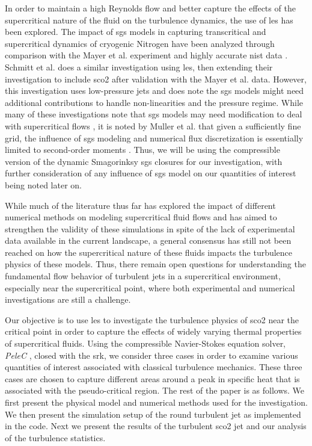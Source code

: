 In order to maintain a high Reynolds flow and better capture the effects of the supercritical nature of the fluid on the turbulence dynamics, the use of \gls{les} has been explored. The impact of \gls{sgs} models in capturing transcritical and supercritical dynamics of cryogenic Nitrogen have been analyzed through comparison with the Mayer et al. experiment and highly accurate \gls{nist} data \cite{PETIT201361, doi:10.1080/00102200500287613, doi:10.1063/1.1795011, doi:10.1063/1.4937948, Same_LES}. Schmitt et al. does a similar investigation using \gls{les}, then extending their investigation to include \gls{sco2} after validation with the Mayer et al. data. \cite{LES_N} However, this investigation uses low-pressure jets and does note the \gls{sgs} models might need additional contributions to handle non-linearities and the pressure regime. While many of these investigations note that \gls{sgs} models may need modification to deal with supercritical flows \cite{LES_N, PETIT201361, doi:10.1063/1.4937948, doi:10.1080/00102200500287613}, it is noted by Muller et al. that given a sufficiently fine grid, the influence of \gls{sgs} modeling and numerical flux discretization is essentially limited to second-order moments \cite{doi:10.1063/1.4937948}. Thus, we will be using the compressible version of the dynamic Smagorinksy \gls{sgs} closures for our investigation, with further consideration of any influence of \gls{sgs} model on our quantities of interest being noted later on. 

While much of the literature thus far has explored the impact of different numerical methods on modeling supercritical fluid flows and has aimed to strengthen the validity of these simulations in spite of the lack of experimental data available in the current landscape, a general consensus has still not been reached on how the supercritical nature of these fluids impacts the turbulence physics of these models. Thus, there remain open questions for understanding the fundamental flow behavior of turbulent jets in a supercritical environment, especially near the supercritical point, where both experimental and numerical investigations are still a challenge.

Our objective is to use \gls{les} to investigate the turbulence physics of \gls{sco2} near the critical point in order to capture the effects of widely varying thermal properties of supercritical fluids. Using the compressible Navier-Stokes equation solver, \textit{PeleC} \cite{osti_1374142}, closed with the \gls{srk}, we consider three cases in order to examine various quantities of interest associated with classical turbulence mechanics. These three cases are chosen to capture different areas around a peak in specific heat that is associated with the pseudo-critical region. The rest of the paper is as follows. We first present the physical model and numerical methods used for the investigation. We then present the simulation setup of the round turbulent jet as implemented in the code. Next we present the results of the turbulent \gls{sco2} jet and our analysis of the turbulence statistics. 





